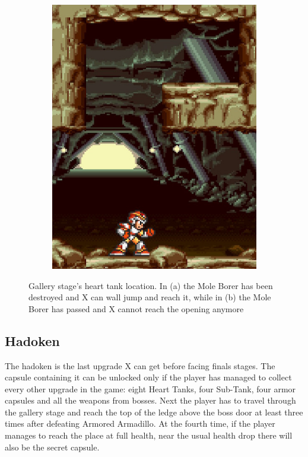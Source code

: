 \begin{figure}[htp]
\begin{subfigure}{0.3\textwidth}
		\includegraphics[width=\linewidth]{figures/X1/Armored_armadillo/Armadillo_heart_2.jpg}
		\caption{}
	\end{subfigure}
	\caption{Gallery stage's heart tank location. In (a) the Mole Borer has been destroyed and X can wall jump and reach it, while in (b) the Mole Borer has passed and X cannot reach the opening anymore}
\end{figure}

\subsection{Hadoken}\label{hadoken}
The hadoken is the last upgrade X can get before facing finals stages. The capsule containing it can be unlocked only if the player has managed to collect every other upgrade in the game: eight Heart Tanks, four Sub-Tank, four armor capsules and all the weapons from bosses. Next the player has to travel through the gallery stage and reach the top of the ledge above the boss door at least three times after defeating Armored Armadillo. At the fourth time, if the player manages to reach the place at full health, near the usual health drop there will also be the secret capsule.

